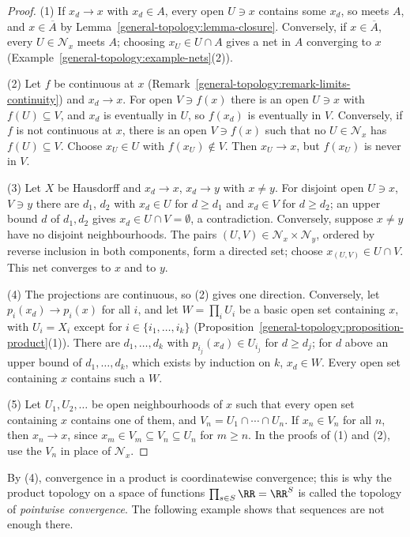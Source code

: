 \begin{proof}
(1) If $x_d \to x$ with $x_d \in A$, every open $U \ni x$ contains some $x_d$, so meets $A$, and $x \in \overline{A}$ by Lemma~\ref{general-topology:lemma-closure}. Conversely, if $x \in \overline{A}$, every
$U \in \mathcal{N}_x$ meets $A$; choosing $x_U \in U \cap A$ gives a net in $A$ converging to $x$ (Example~\ref{general-topology:example-nets}(2)).

(2) Let $f$ be continuous at $x$ (Remark~\ref{general-topology:remark-limits-continuity}) and $x_d \to x$. For open $V \ni f(x)$ there is an open $U \ni x$ with $f(U) \subseteq V$, and $x_d$ is eventually in
$U$, so $f(x_d)$ is eventually in $V$. Conversely, if $f$ is not continuous at $x$, there is an open $V \ni f(x)$ such that no $U \in \mathcal{N}_x$ has $f(U) \subseteq V$. Choose $x_U \in U$ with
$f(x_U) \notin V$. Then $x_U \to x$, but $f(x_U)$ is never in $V$.

(3) Let $X$ be Hausdorff and $x_d \to x$, $x_d \to y$ with $x \neq y$. For disjoint open $U \ni x$, $V \ni y$ there are $d_1$, $d_2$ with $x_d \in U$ for $d \geq d_1$ and $x_d \in V$ for $d \geq d_2$; an
upper bound $d$ of $d_1, d_2$ gives $x_d \in U \cap V = \emptyset$, a contradiction. Conversely, suppose $x \neq y$ have no disjoint neighbourhoods. The pairs $(U, V) \in \mathcal{N}_x \times \mathcal{N}_y$,
ordered by reverse inclusion in both components, form a directed set; choose $x_{(U, V)} \in U \cap V$. This net converges to $x$ and to $y$.

(4) The projections are continuous, so (2) gives one direction. Conversely, let $p_i(x_d) \to p_i(x)$ for all $i$, and let $W = \prod_iU_i$ be a basic open set containing $x$, with $U_i = X_i$ except for
$i \in \{i_1, \ldots, i_k\}$ (Proposition~\ref{general-topology:proposition-product}(1)). There are $d_1, \ldots, d_k$ with $p_{i_j}(x_d) \in U_{i_j}$ for $d \geq d_j$; for $d$ above an upper bound of
$d_1, \ldots, d_k$, which exists by induction on $k$, $x_d \in W$. Every open set containing $x$ contains such a $W$.

(5) Let $U_1, U_2, \ldots$ be open neighbourhoods of $x$ such that every open set containing $x$ contains one of them, and $V_n = U_1 \cap \cdots \cap U_n$. If $x_n \in V_n$ for all $n$, then
$x_n \to x$, since $x_m \in V_m \subseteq V_n \subseteq U_n$ for $m \geq n$. In the proofs of (1) and (2), use the $V_n$ in place of $\mathcal{N}_x$.
\end{proof}

By (4), convergence in a product is coordinatewise convergence; this is why the product topology on a space of functions $\prod_{s \in S}\RR = \RR^S$ is called the topology of
\emph{pointwise convergence}. The following example shows that sequences are not enough there.


